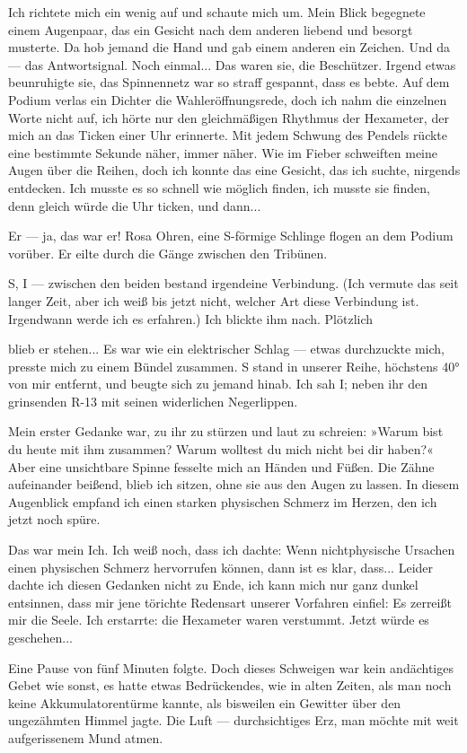 Ich richtete mich ein wenig auf und schaute mich um. Mein Blick
begegnete einem Augenpaar, das ein Gesicht nach dem anderen liebend
und besorgt musterte. Da hob jemand die Hand und gab einem anderen
ein Zeichen. Und da — das Antwortsignal. Noch einmal... Das waren
sie, die Beschützer. Irgend etwas beunruhigte sie, das Spinnennetz
war so straff gespannt, dass es bebte. Auf dem Podium verlas ein
Dichter die Wahleröffnungsrede, doch ich nahm die einzelnen Worte
nicht auf, ich hörte nur den gleichmäßigen Rhythmus der Hexameter,
der mich an das Ticken einer Uhr erinnerte. Mit jedem Schwung des
Pendels rückte eine bestimmte Sekunde näher, immer näher. Wie im
Fieber schweiften meine Augen über die Reihen, doch ich konnte das
eine Gesicht, das ich suchte, nirgends entdecken. Ich musste es so
schnell wie möglich finden, ich musste sie finden, denn gleich
würde die Uhr ticken, und dann...

Er — ja, das war er! Rosa Ohren, eine S-förmige Schlinge flogen an
dem Podium vorüber. Er eilte durch die Gänge zwischen den
Tribünen.

S, I — zwischen den beiden bestand irgendeine Verbindung. (Ich
vermute das seit langer Zeit, aber ich weiß bis jetzt nicht,
welcher Art diese Verbindung ist. Irgendwann werde ich es
erfahren.) Ich blickte ihm nach. Plötzlich

blieb er stehen... Es war wie ein elektrischer Schlag — etwas
durchzuckte mich, presste mich zu einem Bündel zusammen. S stand in
unserer Reihe, höchstens 40° von mir entfernt, und beugte sich zu
jemand hinab. Ich sah I; neben ihr den grinsenden R-13 mit seinen
widerlichen Negerlippen.

Mein erster Gedanke war, zu ihr zu stürzen und laut zu schreien:
»Warum bist du heute mit ihm zusammen? Warum wolltest du mich nicht
bei dir haben?« Aber eine unsichtbare Spinne fesselte mich an
Händen und Füßen. Die Zähne aufeinander beißend, blieb ich sitzen,
ohne sie aus den Augen zu lassen. In diesem Augenblick empfand ich
einen starken physischen Schmerz im Herzen, den ich jetzt noch
spüre.

Das war mein Ich. Ich weiß noch, dass ich dachte: Wenn
nichtphysische Ursachen einen physischen Schmerz hervorrufen
können, dann ist es klar, dass... Leider dachte ich diesen Gedanken
nicht zu Ende, ich kann mich nur ganz dunkel entsinnen, dass mir
jene törichte Redensart unserer Vorfahren einfiel: Es zerreißt mir
die Seele. Ich erstarrte: die Hexameter waren verstummt. Jetzt
würde es geschehen...

Eine Pause von fünf Minuten folgte. Doch dieses Schweigen war kein
andächtiges Gebet wie sonst, es hatte etwas Bedrückendes, wie in
alten Zeiten, als man noch keine Akkumulatorentürme kannte, als
bisweilen ein Gewitter über den ungezähmten Himmel jagte. Die Luft
— durchsichtiges Erz, man möchte mit weit aufgerissenem Mund
atmen.

